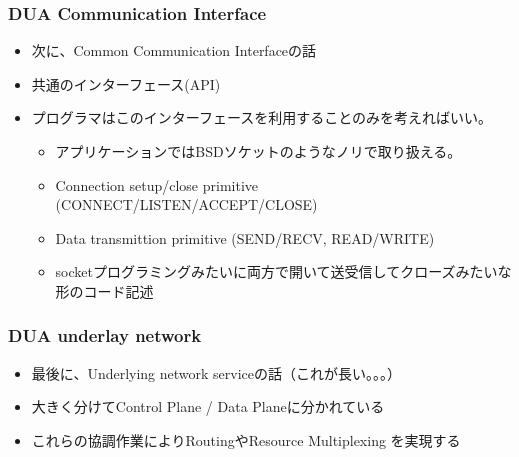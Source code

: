 \documentclass[dvipdfmx,9pt,notheorems]{beamer}
\theoremstyle{definition}
\begin{document}
\begin{frame}\frametitle{DUA Communication Interface}
	\begin{itemize}
		\item 次に、{\color{red}Common Communication Interface}の話
		\item 共通のインターフェース(API)
		\item プログラマはこのインターフェースを利用することのみを考えればいい。
			\begin{itemize}
					\item アプリケーションではBSDソケットのようなノリで取り扱える。
					\item Connection setup/close primitive (CONNECT/LISTEN/ACCEPT/CLOSE)
					\item Data transmittion primitive (SEND/RECV, READ/WRITE)
					\item socketプログラミングみたいに両方で開いて送受信してクローズみたいな形のコード記述
			\end{itemize}
	\end{itemize}
\pnote{
}
\end{frame}

\begin{frame}\frametitle{DUA underlay network}
	\begin{itemize}
		\item 最後に、{\color{red}Underlying network service}の話（これが長い。。。）
		\item 大きく分けてControl Plane / Data Planeに分かれている
		\item これらの協調作業によりRoutingやResource Multiplexing を実現する
	\end{itemize}
\pnote{
}
\end{frame}
\end{document}
